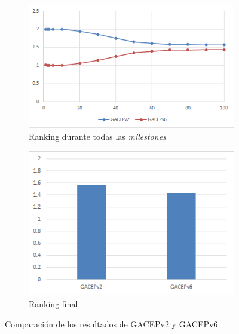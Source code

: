 \begin{figure}[h]
     \centering
     \begin{subfigure}[b]{0.45\textwidth}
         \centering
         \includegraphics[width=\textwidth]{imagenes/Experimental/GACEPv2vsGACEPv6.png}
         \caption{Ranking durante todas las \textit{milestones}}
         \label{fig:GACEPv2vsGACEPv6_lineas}
     \end{subfigure}
     \hfill
     \begin{subfigure}[b]{0.45\textwidth}
         \centering
         \includegraphics[width=\textwidth]{imagenes/Experimental/barras/GACEPv2vsGACEPv6.png}
         \caption{Ranking final}
         \label{fig:GACEPv2vsGACEPv6_barras}
     \end{subfigure}
        \caption{Comparación de los resultados de GACEPv2 y GACEPv6}
        \label{fig:GACEPv2vsGACEPv6}
\end{figure}

